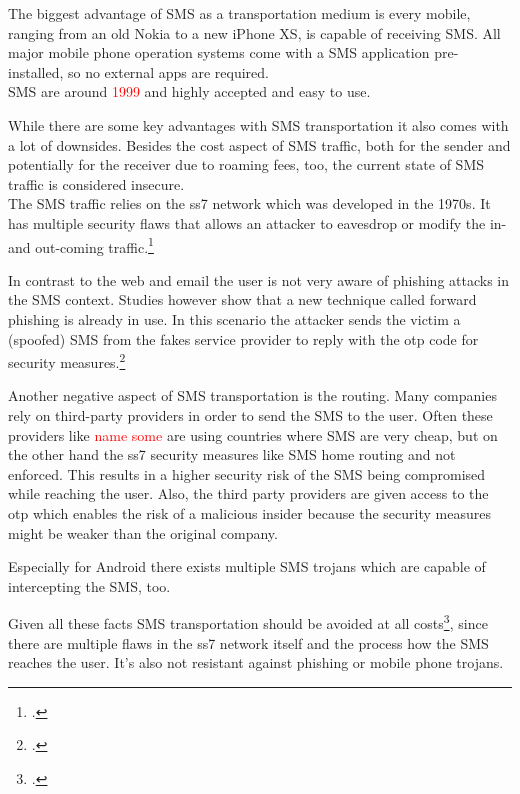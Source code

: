 The biggest advantage of SMS as a transportation medium is every mobile, ranging from an old Nokia to a new iPhone XS, is capable of receiving SMS. All major mobile phone operation systems come with a SMS application pre-installed, so no external apps are required.\\
SMS are around \textcolor{red}{1999} and highly accepted and easy to use.

While there are some key advantages with SMS transportation it also comes with a lot of downsides. Besides the cost aspect of SMS traffic, both for the sender and potentially for the receiver due to roaming fees, too, the current state of SMS traffic is considered insecure.\\
The SMS traffic relies on the \gls{ss7} network which was developed in the 1970s. It has multiple security flaws that allows an attacker to eavesdrop or modify the in- and out-coming traffic.\footcite{WELCH201717,7997246,puzankov2017stealthy}

In contrast to the web and email the user is not very aware of phishing attacks in the SMS context. Studies however show that a new technique called forward phishing is already in use. In this scenario the attacker sends the victim a (spoofed) SMS from the fakes service provider to reply with the \gls{otp} code for security measures.\footcite{JAKOBSSON20186,SIADATI201714}

Another negative aspect of SMS transportation is the routing. Many companies rely on third-party providers in order to send the SMS to the user. Often these providers like \textcolor{red}{name some} are using countries where SMS are very cheap, but on the other hand the \gls{ss7} security measures like SMS home routing and not enforced. This results in a higher security risk of the SMS being compromised while reaching the user. Also, the third party providers are given access to the \gls{otp} which enables the risk of a malicious insider because the security measures might be weaker than the original company.

Especially for Android there exists multiple SMS trojans which are capable of intercepting the SMS, too.

Given all these facts SMS transportation should be avoided at all costs\footcite{JAKOBSSON20186}, since there are multiple flaws in the \gls{ss7} network itself and the process how the SMS reaches the user. It's also not resistant against phishing or mobile phone trojans.


